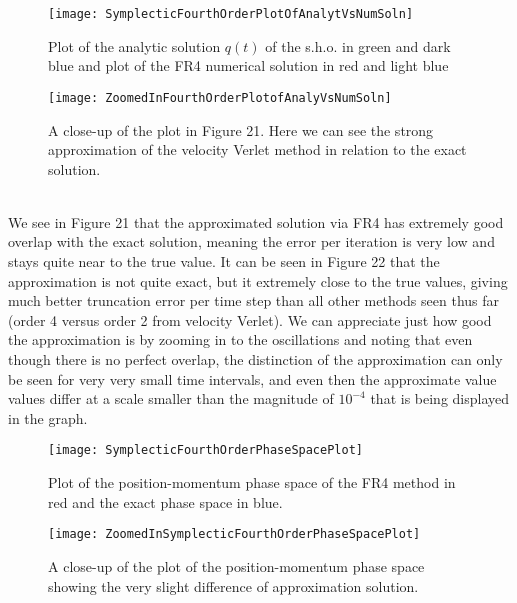 \documentclass[12pt]{article}
\begin{document}
\begin{figure}[h!]
\begin{minipage}[b]{0.45\linewidth}
\centering
\texttt{[image: SymplecticFourthOrderPlotOfAnalytVsNumSoln]}
\caption{Plot of the analytic solution $q(t)$ of the s.h.o. in green and dark blue and plot of the FR4 numerical solution in red and light blue}
\label{fig:figure21}
\end{minipage}
\hspace{0.5cm}
\begin{minipage}[b]{0.45\linewidth}
\centering
\texttt{[image: ZoomedInFourthOrderPlotofAnalyVsNumSoln]}
\caption{A close-up of the plot in Figure 21. Here we can see the strong approximation of the velocity Verlet method in relation to the exact solution.}
\label{fig:figure22}
\end{minipage}
\end{figure}
\\\indent We see in Figure 21 that the approximated solution via FR4 has extremely good overlap with the exact solution, meaning the error per iteration is very low and stays quite near to the true value. It can be seen in Figure 22 that the approximation is not quite exact, but it extremely close to the true values, giving much better truncation error per time step than all other methods seen thus far (order 4 versus order 2 from velocity Verlet). We can appreciate just how good the approximation is by zooming in to the oscillations and noting that even though there is no perfect overlap, the distinction of the approximation can only be seen for very very small time intervals, and even then the approximate value values differ at a scale smaller than the magnitude of $10^{-4}$ that is being displayed in the graph.\\
\begin{figure}[h!]
\begin{minipage}[b]{0.45\linewidth}
\centering
\texttt{[image: SymplecticFourthOrderPhaseSpacePlot]}
\caption{Plot of the position-momentum phase space of the FR4 method in red and the exact phase space in blue.}
\label{fig:figure23}
\end{minipage}
\hspace{0.5cm}
\begin{minipage}[b]{0.45\linewidth}
\centering
\texttt{[image: ZoomedInSymplecticFourthOrderPhaseSpacePlot]}
\caption{A close-up of the plot of the position-momentum phase space showing the very slight difference of approximation solution.}
\label{fig:figure24}
\end{minipage}
\end{figure}
\end{document}
